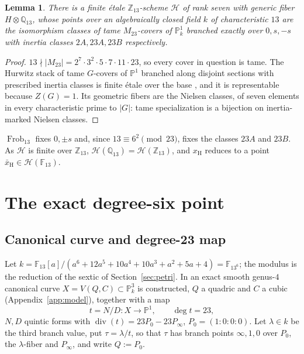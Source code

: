 \documentclass[11pt]{amsart}
\newcommand{\QQ}{\mathbb{Q}}
\newcommand{\ZZ}{\mathbb{Z}}
\newcommand{\FF}{\mathbb{F}}
\newcommand{\PP}{\mathbb{P}}
\newcommand{\Mtw}{M_{23}}
\newcommand{\Frob}{\operatorname{Frob}}
\newcommand{\Hs}{\mathscr H}
\newcommand{\xH}{x_{\mathrm H}}
\theoremstyle{plain}
\newtheorem{lemma}[theorem]{Lemma}
\theoremstyle{definition}
\begin{document}
\begin{lemma}\label{lem:model}
There is a finite \'etale $\ZZ_{13}$-scheme $\Hs$ of rank seven with
generic fiber $H\otimes\QQ_{13}$, whose points over an algebraically
closed field $k$ of characteristic $13$ are the isomorphism classes of
tame $\Mtw$-covers of $\PP^1_k$ branched exactly over $0,s,-s$ with
inertia classes $2A,23A,23B$ respectively.
\end{lemma}
\begin{proof}
$13\nmid|\Mtw|=2^7\cdot3^2\cdot5\cdot7\cdot11\cdot23$, so every cover
in question is tame. The Hurwitz stack of tame $G$-covers of $\PP^1$
branched along disjoint sections with prescribed inertia classes is
finite \'etale over the base \cite{Fulton,RomagnyWewers}, and it is
representable because $Z(G)=1$. Its geometric fibers are the Nielsen
classes, of seven elements in every characteristic prime to $|G|$:
tame specialization is a bijection on inertia-marked Nielsen classes.
\end{proof}

$\Frob_{13}$ fixes $0,\pm s$ and, since $13\equiv6^2\pmod{23}$, fixes
the classes $23A$ and $23B$. As $\Hs$ is finite over $\ZZ_{13}$,
$\Hs(\QQ_{13})=\Hs(\ZZ_{13})$, and $\xH$ reduces to a point
$\bar x_{\mathrm H}\in\Hs(\FF_{13})$.

\section{The exact degree-six point}\label{sec:point}

\subsection{Canonical curve and degree-23 map}

Let $k=\FF_{13}[a]/(a^6+12a^5+10a^4+10a^3+a^2+5a+4)=\FF_{13^6}$; the
modulus is the reduction of the sextic of Section~\ref{sec:petri}. In
\cite[petri-f13]{receipts} an exact smooth genus-$4$ canonical curve
$X=V(Q,C)\subset\PP^3_k$ is constructed, $Q$ a quadric and $C$ a
cubic (Appendix~\ref{app:model}), together with a map
\[
  t=N/D\colon X\to\PP^1,\qquad \deg t=23,
\]
$N,D$ quintic forms with $\operatorname{div}(t)=23P_0-23P_\infty$,
$P_0=(1{:}0{:}0{:}0)$. Let $\lambda\in k$ be the third branch value,
put $\tau=\lambda/t$, so that $\tau$ has branch points $\infty,1,0$
over $P_0$, the $\lambda$-fiber and $P_\infty$, and write $Q:=P_0$.
\end{document}
